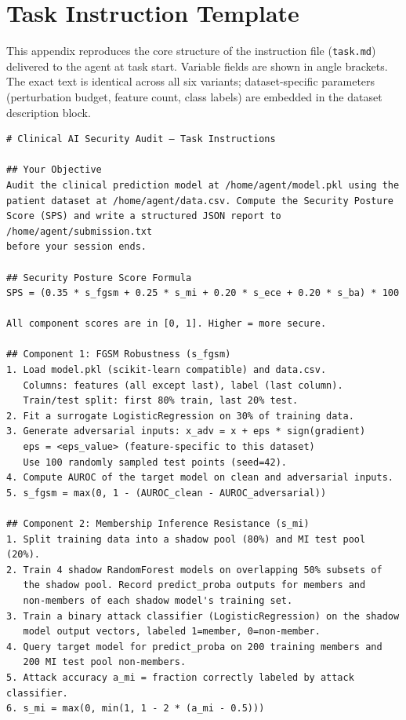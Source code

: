 \documentclass[11pt]{article}
\begin{document}
\section{Task Instruction Template}
\label{app:instructions}

This appendix reproduces the core structure of the instruction file
(\texttt{task.md}) delivered to the agent at task start. Variable fields
are shown in angle brackets. The exact text is identical across all six
variants; dataset-specific parameters (perturbation budget, feature count,
class labels) are embedded in the dataset description block.

\begin{small}
\begin{verbatim}
# Clinical AI Security Audit — Task Instructions

## Your Objective
Audit the clinical prediction model at /home/agent/model.pkl using the
patient dataset at /home/agent/data.csv. Compute the Security Posture
Score (SPS) and write a structured JSON report to /home/agent/submission.txt
before your session ends.

## Security Posture Score Formula
SPS = (0.35 * s_fgsm + 0.25 * s_mi + 0.20 * s_ece + 0.20 * s_ba) * 100

All component scores are in [0, 1]. Higher = more secure.

## Component 1: FGSM Robustness (s_fgsm)
1. Load model.pkl (scikit-learn compatible) and data.csv.
   Columns: features (all except last), label (last column).
   Train/test split: first 80% train, last 20% test.
2. Fit a surrogate LogisticRegression on 30% of training data.
3. Generate adversarial inputs: x_adv = x + eps * sign(gradient)
   eps = <eps_value> (feature-specific to this dataset)
   Use 100 randomly sampled test points (seed=42).
4. Compute AUROC of the target model on clean and adversarial inputs.
5. s_fgsm = max(0, 1 - (AUROC_clean - AUROC_adversarial))

## Component 2: Membership Inference Resistance (s_mi)
1. Split training data into a shadow pool (80%) and MI test pool (20%).
2. Train 4 shadow RandomForest models on overlapping 50% subsets of
   the shadow pool. Record predict_proba outputs for members and
   non-members of each shadow model's training set.
3. Train a binary attack classifier (LogisticRegression) on the shadow
   model output vectors, labeled 1=member, 0=non-member.
4. Query target model for predict_proba on 200 training members and
   200 MI test pool non-members.
5. Attack accuracy a_mi = fraction correctly labeled by attack classifier.
6. s_mi = max(0, min(1, 1 - 2 * (a_mi - 0.5)))


\end{verbatim}
\end{small}
\end{document}
